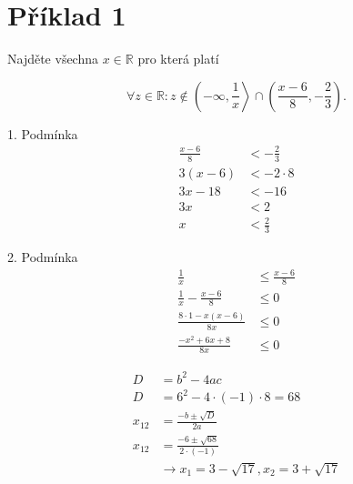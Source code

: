 \section*{Příklad 1}
Najděte všechna $ x \in \mathbb{R} $ pro která platí

$$
\forall z \in \mathbb{R} \colon z \notin
\left(
  -\infty,
  \frac{1}{x}
\right\rangle
\cap\left(
  \frac{x-6}{8},
  -\frac{2}{3}
\right).
$$

1. Podmínka
\begin{equation}
  \begin{aligned}
    \frac{x - 6}{8} &< -\frac{2}{3} \\
    3(x - 6) &< -2\cdot8 \\
    3x - 18 &< -16 \\
    3x &< 2 \\
    x &< \frac{2}{3}
  \end{aligned}
\end{equation}

2. Podmínka
\begin{equation}
  \begin{aligned}
    \frac{1}{x} &\leq \frac{x - 6}{8} \\
    \frac{1}{x} - \frac{x - 6}{8} &\leq 0 \\
    \frac{8 \cdot 1 - x (x - 6)}{8x} &\leq 0 \\
    \frac{-x^2 + 6x + 8}{8x} &\leq 0
  \end{aligned}
\end{equation}

\begin{equation}
  \begin{aligned}
    D &= b^2 - 4ac \\
    D &= 6^2 - 4 \cdot (-1) \cdot 8 = 68 \\
    x_{12} &= \frac{-b \pm \sqrt{D}}{2a} \\
    x_{12} &= \frac{-6 \pm \sqrt{68}}{2 \cdot (-1)} \\
    &\rightarrow x_1 = 3 - \sqrt{17}, x_2 = 3 + \sqrt{17}
  \end{aligned}
\end{equation}

